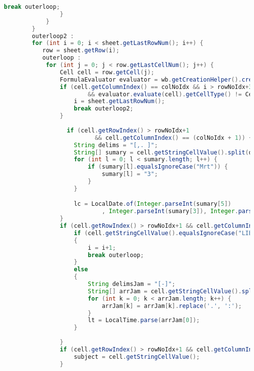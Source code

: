 \begin{lstlisting}[language=Java,basicstyle=\tiny,caption=ExcelConverter.java sebelum revisi,label=lst:ExcelConverterLama]
                    break outerloop;
                }
            }
        }
        outerloop2 :
        for (int i = 0; i < sheet.getLastRowNum(); i++) {
           row = sheet.getRow(i);
           outerloop :
            for (int j = 0; j < row.getLastCellNum(); j++) {
                Cell cell = row.getCell(j);
                FormulaEvaluator evaluator = wb.getCreationHelper().createFormulaEvaluator();
                if (cell.getColumnIndex() == colNoIdx && i > rowNoIdx+3
                        && evaluator.evaluate(cell).getCellType() != Cell.CELL_TYPE_NUMERIC) {
                    i = sheet.getLastRowNum();
                    break outerloop2;
                }
                
                  if (cell.getRowIndex() > rowNoIdx+1 
                          && cell.getColumnIndex() == (colNoIdx + 1)) {
                    String delims = "[,. ]";
                    String[] sumary = cell.getStringCellValue().split(delims);
                    for (int l = 0; l < sumary.length; l++) {
                        if (sumary[l].equalsIgnoreCase("Mrt")) {
                            sumary[l] = "3";
                        }
                    }

                    lc = LocalDate.of(Integer.parseInt(sumary[5])
                            , Integer.parseInt(sumary[3]), Integer.parseInt(sumary[2]));
                }
                if (cell.getRowIndex() > rowNoIdx+1 && cell.getColumnIndex() == (colNoIdx + 2)) {
                    if (cell.getStringCellValue().equalsIgnoreCase("LIBUR"))
                    {   
                        i = i+1;
                        break outerloop;
                    }
                    else
                    {
                        String delimsJam = "[-]";
                        String[] arrJam = cell.getStringCellValue().split(delimsJam);
                        for (int k = 0; k < arrJam.length; k++) {
                            arrJam[k] = arrJam[k].replace('.', ':');
                        }
                        lt = LocalTime.parse(arrJam[0]);
                    }
                                        
                }
                if (cell.getRowIndex() > rowNoIdx+1 && cell.getColumnIndex() == (colNoIdx + 5)) {
                    subject = cell.getStringCellValue();
                }
   

\end{lstlisting}
